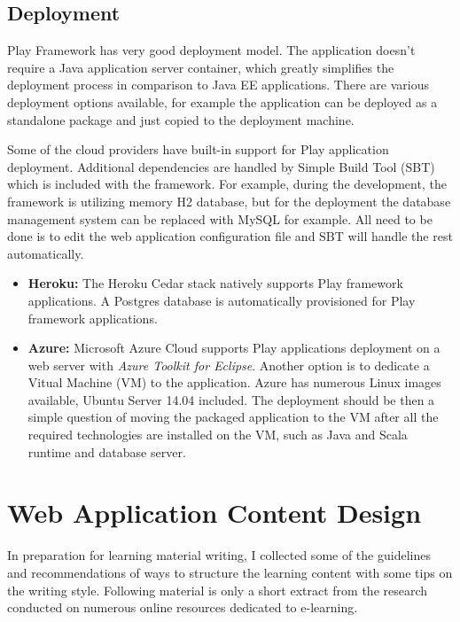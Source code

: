 \documentclass[12pt,twoside,a4paper]{report}
\begin{document}
\subsection{Deployment}\label{3.3.3}
Play Framework has very good deployment model. The application doesn't require a Java application server container, which greatly simplifies the deployment process in comparison to Java EE applications. There are various deployment options available, for example the application can be deployed as a standalone package and just copied to the deployment machine. 

Some of the cloud providers have built-in support for Play application deployment. Additional dependencies are handled by Simple Build Tool (SBT)\cite{29} which is included with the framework. For example,	 during the development, the framework is utilizing memory H2 database, but for the deployment the database management system can be replaced with MySQL for example. All need to be done is to edit the web application configuration file and SBT will handle the rest automatically.

\begin{itemize}\itemsep1pt \parskip0pt 
\item \textbf{Heroku:} The Heroku Cedar stack natively supports Play framework applications. A Postgres database is automatically provisioned for Play framework applications.\cite{26}
\item \textbf{Azure:} Microsoft Azure Cloud supports Play applications deployment on a web server with \emph{Azure Toolkit for Eclipse}. Another option is to dedicate a Vitual Machine (VM) to the application. Azure has numerous Linux images available, Ubuntu Server 14.04 included. The deployment should be then a simple question of moving the packaged application to the VM after all the required technologies are installed on the VM, such as Java and Scala runtime and database server.\cite{27}
\end{itemize}

\section{Web Application Content Design}\label{3.4}
In preparation for learning material writing, I collected some of the guidelines and recommendations of ways to structure the learning content with some tips on the writing style. Following material is only a short extract from the research conducted on numerous online resources dedicated to e-learning.
\end{document}
